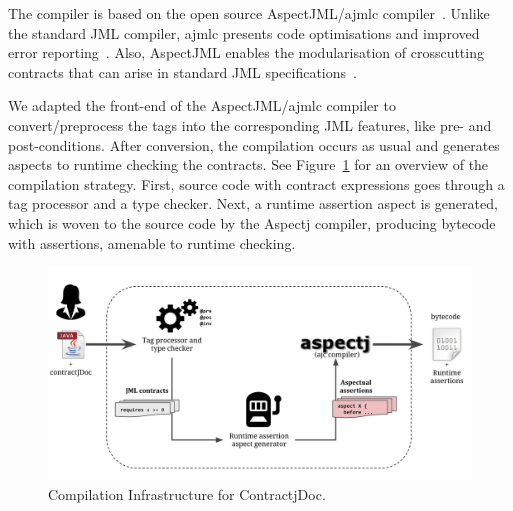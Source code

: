 The \contractjdoc{} compiler is based on the open source AspectJML/ajmlc compiler~\cite{aspectjml,ajmlc,Rebelo-etal08}.
Unlike the standard JML compiler, ajmlc presents code optimisations and improved error reporting~\cite{ajmlc}.
Also, AspectJML enables the modularisation
of crosscutting contracts that can arise in standard
JML specifications~\cite{aspectjml}.

We adapted the front-end of the AspectJML/ajmlc compiler to convert/preprocess the \contractjdoc{} tags into the corresponding JML features, like pre- and post-conditions.
After conversion, the compilation occurs as usual and generates aspects to runtime checking the
contracts. See Figure~\ref{fig:compilerInfra}
for an overview of the compilation strategy.
First, source code with \contractjdoc{}
contract expressions goes through a tag processor and a type checker. Next, a runtime assertion aspect is generated, which is woven to the source code by the Aspectj compiler, producing bytecode with assertions, amenable to runtime checking.


\begin{figure}[h]
\centering
\includegraphics[width=1.0\textwidth]{figs/compilerInfra}
\caption{Compilation Infrastructure for ContractjDoc.}
\label{fig:compilerInfra}
\end{figure}

